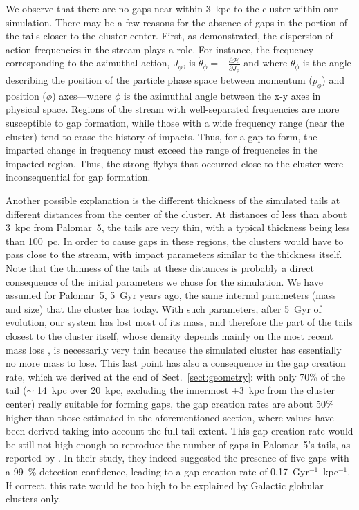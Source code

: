 \documentclass[draft]{aa}
\begin{document}
    We observe that there are no gaps near within 3~kpc to the cluster within our simulation. There may be a few reasons for the absence of gaps in the portion of the tails closer to the cluster center. First, as \citet{2016MNRAS.457.3817S} demonstrated, the dispersion of action-frequencies in the stream plays a role. For instance, the frequency corresponding to the azimuthal action, $J_\phi$, is $\dot\theta_\phi = - \frac{\mathcal{\partial H}}{\partial J_\phi}$ and where $\theta_\phi$ is the angle describing the position of the particle phase space between momentum ($p_\phi$) and position ($\phi$) axes---where $\phi$ is the azimuthal angle between the x-y axes in physical space. Regions of the stream with well-separated frequencies are more susceptible to gap formation, while those with a wide frequency range (near the cluster) tend to erase the history of impacts. Thus, for a gap to form, the imparted change in frequency must exceed the range of frequencies in the impacted region. Thus, the strong flybys that occurred close to the cluster were inconsequential for gap formation. 
    
    Another possible explanation is the different thickness of the simulated tails at different distances from the center of the cluster. At distances of less than about 3~kpc from Palomar~5, the tails are very thin, with a typical thickness being less than 100~pc. In order to cause gaps in these regions, the clusters would have to pass close to the stream, with impact parameters similar to the thickness itself. Note that the thinness of the tails at these distances is probably a direct consequence of the initial parameters we chose for the simulation. We have assumed for Palomar~5, 5~Gyr years ago, the same internal parameters (mass and size) that the cluster has today. With such parameters, after 5~Gyr of evolution, our system has lost most of its mass, and therefore the part of the tails closest to the cluster itself, whose density depends mainly on the most recent mass loss \citep[see, for example, Fig.~A.3 in][]{2012A&A...546L...7M}, is necessarily very thin because the simulated cluster has essentially no more mass to lose. This last point has also a consequence in the gap creation rate, which we derived at the end of Sect.~\ref{sect:geometry}: with only 70\% of the tail  ($\sim$ 14~kpc over 20~kpc, excluding the innermost $\pm 3$~kpc from the cluster center) really suitable for forming gaps, the gap creation rates are about 50$\%$ higher than those estimated in the aforementioned section, where values have been derived taking into account the full tail extent. This gap creation rate would be still not high enough to reproduce the  number of gaps in Palomar~5's tails, as reported by \citet{2012ApJ...760...75C}. In their study, they indeed suggested the presence of  five gaps with a 99~\% detection confidence, leading to a gap creation rate of 0.17~Gyr$^{-1}$~kpc$^{-1}$. If correct, this rate would be too high to be explained by Galactic globular clusters only. 
\end{document}
